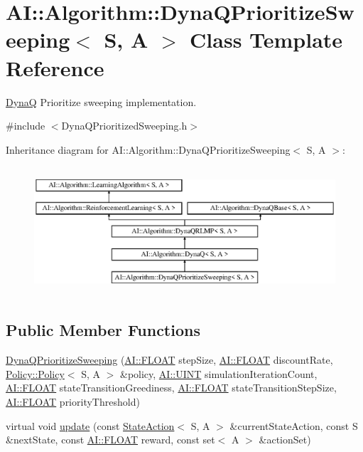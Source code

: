 \hypertarget{classAI_1_1Algorithm_1_1DynaQPrioritizeSweeping}{\section{A\-I\-:\-:Algorithm\-:\-:Dyna\-Q\-Prioritize\-Sweeping$<$ S, A $>$ Class Template Reference}
\label{classAI_1_1Algorithm_1_1DynaQPrioritizeSweeping}
}


\hyperlink{classAI_1_1Algorithm_1_1DynaQ}{Dyna\-Q} Prioritize sweeping implementation.  




{\ttfamily \#include $<$Dyna\-Q\-Prioritized\-Sweeping.\-h$>$}

Inheritance diagram for A\-I\-:\-:Algorithm\-:\-:Dyna\-Q\-Prioritize\-Sweeping$<$ S, A $>$\-:\begin{figure}[H]
\begin{center}
\leavevmode
\includegraphics[height=4.794520cm]{classAI_1_1Algorithm_1_1DynaQPrioritizeSweeping}
\end{center}
\end{figure}
\subsection*{Public Member Functions}
\begin{DoxyCompactItemize}
\item 
\hyperlink{classAI_1_1Algorithm_1_1DynaQPrioritizeSweeping_ac1b32e8772e967a3bb74ac34708e4dfe}{Dyna\-Q\-Prioritize\-Sweeping} (\hyperlink{namespaceAI_a41b74884a20833db653dded3918e05c3}{A\-I\-::\-F\-L\-O\-A\-T} step\-Size, \hyperlink{namespaceAI_a41b74884a20833db653dded3918e05c3}{A\-I\-::\-F\-L\-O\-A\-T} discount\-Rate, \hyperlink{classAI_1_1Algorithm_1_1Policy_1_1Policy}{Policy\-::\-Policy}$<$ S, A $>$ \&policy, \hyperlink{namespaceAI_ab6e14dc1e659854858a87e511f1439ec}{A\-I\-::\-U\-I\-N\-T} simulation\-Iteration\-Count, \hyperlink{namespaceAI_a41b74884a20833db653dded3918e05c3}{A\-I\-::\-F\-L\-O\-A\-T} state\-Transition\-Greediness, \hyperlink{namespaceAI_a41b74884a20833db653dded3918e05c3}{A\-I\-::\-F\-L\-O\-A\-T} state\-Transition\-Step\-Size, \hyperlink{namespaceAI_a41b74884a20833db653dded3918e05c3}{A\-I\-::\-F\-L\-O\-A\-T} priority\-Threshold)
\item 
virtual void \hyperlink{classAI_1_1Algorithm_1_1DynaQPrioritizeSweeping_ad08b55f3cf927189dd31abf9fc1c2959}{update} (const \hyperlink{classAI_1_1StateAction}{State\-Action}$<$ S, A $>$ \&current\-State\-Action, const S \&next\-State, const \hyperlink{namespaceAI_a41b74884a20833db653dded3918e05c3}{A\-I\-::\-F\-L\-O\-A\-T} reward, const set$<$ A $>$ \&action\-Set)
\end{DoxyCompactItemize}
